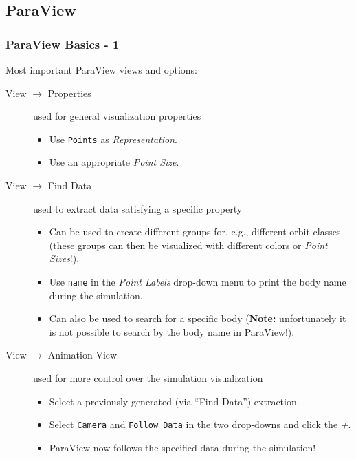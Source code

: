\subsection{ParaView}
\begin{frame}[fragile]
	\frametitle{ParaView Basics - 1}
	Most important ParaView views and options:
	\setlength{\leftmargini}{-0.4cm}
    \setlength{\leftmarginii}{-0.4cm}
    \begin{description}
      \item[View $\rightarrow$ Properties] used for general visualization properties
      \begin{itemize}
          \item Use \texttt{Points} as \textit{Representation}.
          \item Use an appropriate \textit{Point Size}.
      \end{itemize}
      \item[View $\rightarrow$ Find Data] used to extract data satisfying a specific property
      \begin{itemize}
          \item Can be used to create different groups for, e.g., different orbit classes (these groups can then be visualized with different colors or \textit{Point Sizes}!).
          \item Use \texttt{name} in the \textit{Point Labels} drop-down menu to print the body name during the simulation.
          \item Can also be used to search for a specific body (\textbf{Note:} unfortunately it is not possible to search by the body name in ParaView!).
      \end{itemize}
      \item[View $\rightarrow$ Animation View] used for more control over the simulation visualization
      \begin{itemize}
          \item Select a previously generated (via \enquote{Find Data}) extraction.
          \item Select \texttt{Camera} and \texttt{Follow Data} in the two drop-downs and click the \textit{+}.
          \item ParaView now follows the specified data during the simulation!
      \end{itemize}
    \end{description}
\end{frame}

